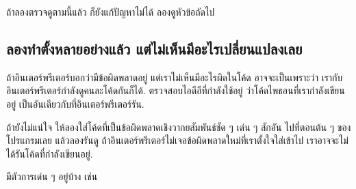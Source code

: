 ถ้าลองตรวจดูตามนี้แล้ว ก็ยังแก้ปัญหาไม่ได้ ลองดูหัวข้อถัดไป

\subsection{ลองทำตั้งหลายอย่างแล้ว แต่ไม่เห็นมีอะไรเปลี่ยนแปลงเลย}



ถ้าอินเตอร์พรีเตอร์บอกว่ามีข้อผิดพลาดอยู่
แต่เราไม่เห็นมีอะไรผิดในโค้ด
อาจจะเป็นเพราะว่า เรากับอินเตอร์พรีเตอร์กำลังดูคนละโค้ดกันก็ได้.
ตรวจสอบไอดีอีที่กำลังใช้อยู่ ว่าโค้ดไพธอนที่เรากำลังเขียนอยู่ เป็นอันเดียวกับที่อินเตอร์พรีเตอร์รัน.


ถ้ายังไม่แน่ใจ ให้ลองใส่โค้ดที่เป็นข้อผิดพลาดเชิงวากยสัมพันธ์ชัด ๆ เด่น ๆ สักอัน ไปที่ตอนต้น ๆ ของโปรแกรมเลย แล้วลองรันดู
ถ้าอินเตอร์พรีเตอร์ไม่เจอข้อผิดพลาดใหม่ที่เราตั้งใจใส่เข้าไป เราอาจจะไม่ได้รันโค้ดที่กำลังเขียนอยู่.


มีตัวการเด่น ๆ อยู่บ้าง เช่น

